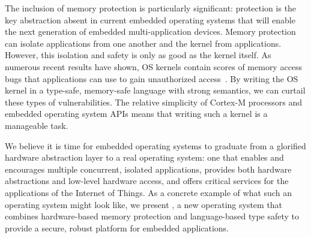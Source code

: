 The inclusion of memory protection is particularly significant: protection is
the key abstraction absent in current embedded operating systems that will
enable the next generation of embedded multi-application devices. Memory
protection can isolate applications from one another and the kernel from
applications. However, this isolation and safety is only as good as the kernel
itself. As numerous recent results have shown, OS kernels contain scores of
memory access bugs that applications can use to gain unauthorized
access~\cite{nickolai}. By writing the OS kernel in a type-safe, memory-safe
language with strong semantics, we can curtail these types of vulnerabilities.
The relative simplicity of Cortex-M processors and embedded operating system
APIs means that writing such a kernel is a manageable task.

We believe it is time for embedded operating systems to graduate from  a
glorified hardware abstraction layer to a real operating system: one that
enables and encourages multiple concurrent, isolated applications, provides both
hardware abstractions and low-level hardware access, and offers critical
services for the applications of the Internet of Things. As a concrete example
of what such an operating system might look like, we present \name, a new
operating system that combines hardware-based memory protection and
language-based type safety to provide a secure, robust platform for embedded
applications.

%
